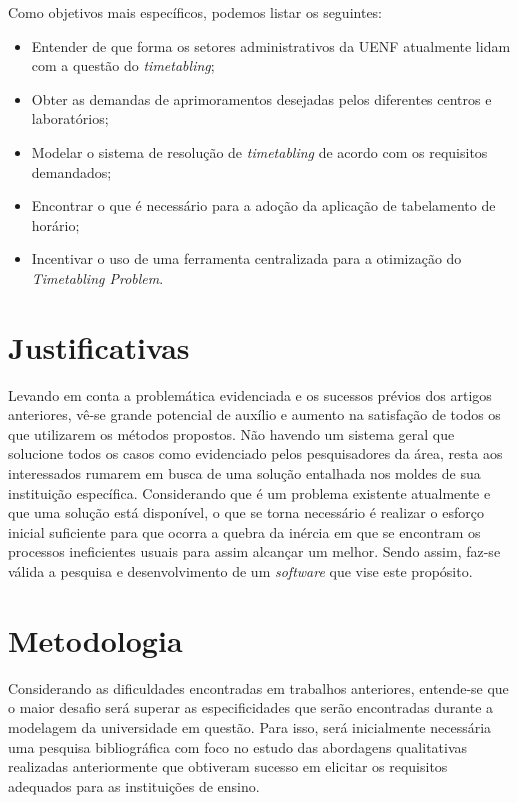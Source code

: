 Como objetivos mais específicos, podemos listar os seguintes:

\begin{itemize}
  \item Entender de que forma os setores administrativos da UENF atualmente lidam com a questão do \textit{timetabling};
  \item Obter as demandas de aprimoramentos desejadas pelos diferentes centros e laboratórios;
  \item Modelar o sistema de resolução de \textit{timetabling} de acordo com os requisitos demandados;
  \item Encontrar o que é necessário para a adoção da aplicação de tabelamento de horário;
  \item Incentivar o uso de uma ferramenta centralizada para a otimização do \textit{Timetabling Problem}.
\end{itemize}

\section{Justificativas} %

Levando em conta a problemática evidenciada e os sucessos prévios dos artigos anteriores, vê-se grande potencial de auxílio e aumento na satisfação de todos os que utilizarem os métodos propostos. Não havendo um sistema geral que solucione todos os casos como evidenciado pelos pesquisadores da área, resta aos interessados rumarem em busca de uma solução entalhada nos moldes de sua instituição específica. Considerando que é um problema existente atualmente e que uma solução está disponível, o que se torna necessário é realizar o esforço inicial suficiente para que ocorra a quebra da inércia em que se encontram os processos ineficientes usuais para assim alcançar um melhor. Sendo assim, faz-se válida a pesquisa e desenvolvimento de um \textit{software} que vise este propósito.

\section{Metodologia} %

Considerando as dificuldades encontradas em trabalhos anteriores, entende-se que o maior desafio será superar as especificidades que serão encontradas durante a modelagem da universidade em questão. Para isso, será inicialmente necessária uma pesquisa bibliográfica com foco no estudo das abordagens qualitativas realizadas anteriormente que obtiveram sucesso em elicitar os requisitos adequados para as instituições de ensino.

